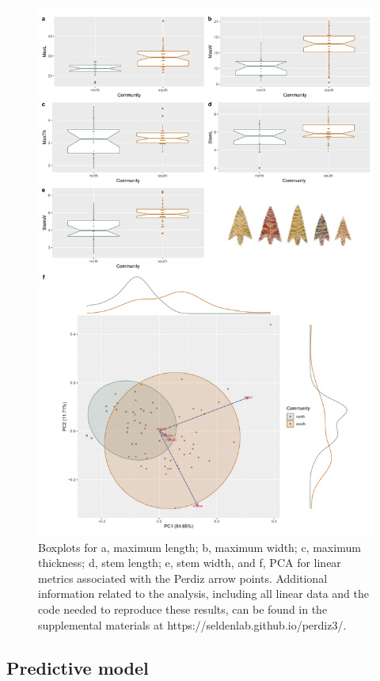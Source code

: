 \documentclass[smallextended]{svjour3}       %
\begin{document}
\begin{figure}
\includegraphics[width=0.95\linewidth]{ms-figs/figure2} \caption{Boxplots for a, maximum length; b, maximum width; c, maximum thickness; d, stem length; e, stem width, and f, PCA for linear metrics associated with the Perdiz arrow points. Additional information related to the analysis, including all linear data and the code needed to reproduce these results, can be found in the supplemental materials at https://seldenlab.github.io/perdiz3/.}\label{fig:fig2}
\end{figure}

\hypertarget{predictive-model}{%
\subsection{Predictive model}\label{predictive-model}}
\end{document}
